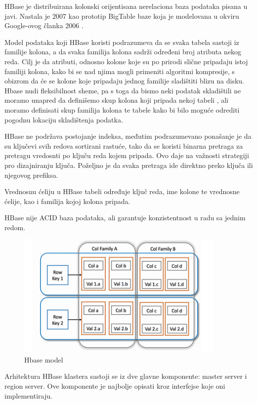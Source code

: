 \documentclass[12pt,oneside]{memoir}
\begin{document}
HBase je distribuirana kolonski orijentisana nerelaciona baza podataka  pisana u javi.  Nastala je 2007 kao prototip BigTable baze koja je modelovana u okviru Google-ovog članka 2006 \cite{BigTable}. 

Model podataka koji HBase koristi podrazumeva da se svaka tabela sastoji iz familije kolona, a da svaka familija kolona sadrži određeni broj atributa nekog reda. Cilj je da atributi, odnosno kolone koje su po prirodi slične pripadaju istoj familiji kolona, kako bi se nad njima mogli primeniti algoritmi kompresije, s obizrom da će se kolone koje pripadaju jednog familije sladištiti blizu na disku. Hbase nudi fleksibilnost sheme, pa s toga da bismo neki podatak skladištili ne moramo unapred da definišemo skup kolona koji pripada nekoj tabeli , ali moramo definisati skup familija kolona te tabele kako bi bilo moguće odrediti pogodnu lokaciju skladištenja podatka.

HBase ne podržava postojanje indeksa, međutim podrazumevano ponašanje je da su ključevi svih redova sortirani rastuće, tako da se koristi binarna pretraga za pretragu vredosnti po ključu reda kojem pripada. Ovo daje na važnosti strategiji pro dizajniranju ključa. Poželjno je da svaka pretraga ide direktno preko ključa ili njegovog prefiksa. 

Vrednosnu ćeliju u HBase tabeli određuje ključ reda, ime kolone te vrednosne ćelije, kao i familija kojoj kolona pripada.

HBase nije ACID baza podataka, ali garantuje konzistentnost u radu sa jednim redom.

\begin{figure}[!ht]
  \centering
  \includegraphics[width=0.9\textwidth]{colFamily.png}
  \caption{Hbase model}
  \label{fig:grafikon}
\end{figure}

Arhitektura HBase klastera sastoji se iz dve glavne komponente:  master server i region server.  Ove komponente je najbolje opisati kroz interfejse koje oni implementiraju. 
\end{document}
